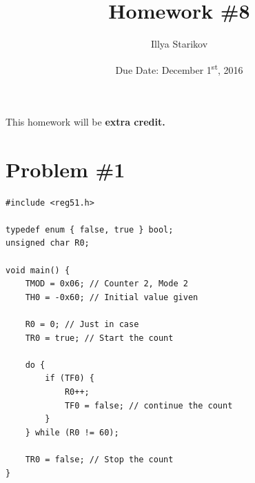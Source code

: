 \documentclass[12pt]{article}
\title{Homework \#8}
\date{Due Date: December 1\textsuperscript{st}, 2016}
\author{Illya Starikov}
\begin{document}
\maketitle

\noindent This homework will be \textbf{extra credit.}

\section{Problem \#1}
\begin{lstlisting}[style=cC]
#include <reg51.h>

typedef enum { false, true } bool;
unsigned char R0;

void main() {
	TMOD = 0x06; // Counter 2, Mode 2
	TH0 = -0x60; // Initial value given

	R0 = 0; // Just in case
	TR0 = true; // Start the count

	do {
		if (TF0) {
			R0++;
			TF0 = false; // continue the count
		}
	} while (R0 != 60);

	TR0 = false; // Stop the count
}
\end{lstlisting}
\end{document}
